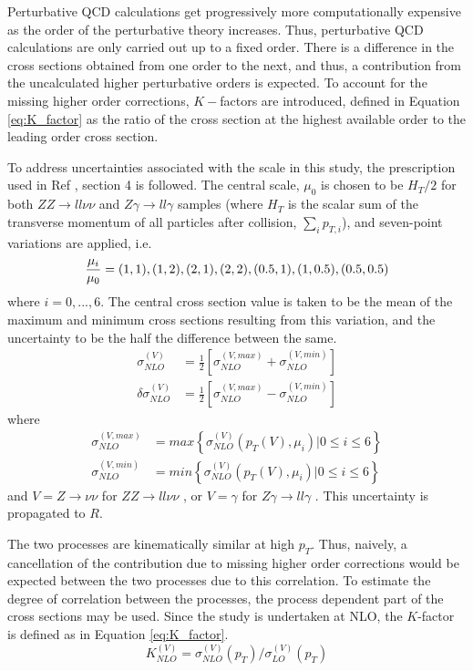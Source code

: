 \documentclass[11pt,a4paper,openright,twoside]{report}
\newcommand{\ZZ}{$ZZ\to ll\nu\nu$ }
\newcommand{\Zg}{$Z\gamma\to ll\gamma$ }
\begin{document}
Perturbative QCD calculations get progressively more computationally expensive as the order of the perturbative theory increases. Thus, perturbative QCD calculations are only carried out up to a fixed order. There is a difference in the cross sections obtained from one order to the next, and thus, a contribution from the uncalculated higher perturbative orders is expected. To account for the missing higher order corrections, $K-$factors are introduced, defined in Equation \ref{eq:K_factor} as the ratio of the cross section at the highest available order to the leading order cross section.

To address uncertainties associated with the scale in this study, the prescription used in Ref \cite{precise_scale}, section 4 is followed. The central scale, $\mu_0$ is chosen to be $H_{T}/2$ for both \ZZ and \Zg samples (where $H_T$ is the scalar sum of the transverse momentum of all particles after collision, $\sum_{i} p_{T,i}$), and seven-point variations are applied, i.e.
\begin{equation}
\frac{\mu_i}{\mu_0} = (1,1),(1,2),(2,1),(2,2),(0.5,1),(1,0.5),(0.5,0.5)\\
\label{eq:scale}
\end{equation}
where $i=0,...,6$. The central cross section value is taken to be the mean of the maximum and minimum cross sections resulting from this variation, and the uncertainty to be the half the difference between the same.
\begin{align}
\sigma_{NLO}^{(V)} &= \frac{1}{2}\left[\sigma_{NLO}^{(V,max)} + \sigma_{NLO}^{(V,min)}\right]\label{eq:scale_central}\\
\delta\sigma_{NLO}^{(V)} &= \frac{1}{2}\left[\sigma_{NLO}^{(V,max)} - \sigma_{NLO}^{(V,min)}\right]
\label{eq:scale_central2}
\end{align}
where
\begin{align}
\sigma_{NLO}^{(V,max)} &= max\left\lbrace\sigma_{NLO}^{(V)}(p_{T}(V),\mu_i)|0\leq i \leq 6\right\rbrace\\
\sigma_{NLO}^{(V,min)} &= min\left\lbrace\sigma_{NLO}^{(V)}(p_{T}(V),\mu_i)|0\leq i \leq 6\right\rbrace
\end{align}
and $V = Z\to\nu\nu$ for \ZZ, or $V = \gamma$ for \Zg. This uncertainty is propagated to $R$.

The two processes are kinematically similar at high $p_T$. Thus, naively, a cancellation of the contribution due to missing higher order corrections would be expected between the two processes due to this correlation. To estimate the degree of correlation between the processes, the process dependent part of the cross sections may be used. Since the study is undertaken at NLO, the $K$-factor is defined as in Equation \ref{eq:K_factor}.
\begin{equation}
K_{NLO}^{(V)} = \sigma_{NLO}^{(V)}(p_T)/\sigma_{LO}^{(V)}(p_T)
\label{eq:K_factor}
\end{equation}
\end{document}
